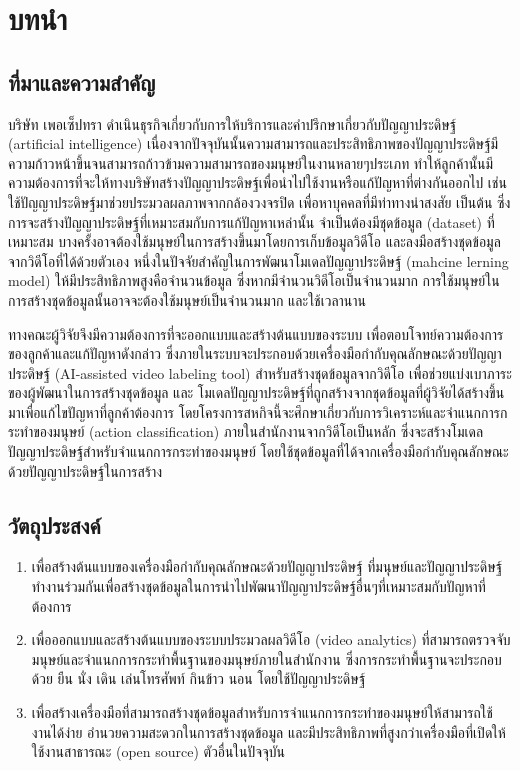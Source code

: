 \chapter{บทนำ}
\section{ที่มาและความสำคัญ}
บริษัท เพอเซ็ปทรา ดำเนินธุรกิจเกี่ยวกับการให้บริการและคำปรึกษาเกี่ยวกับปัญญาประดิษฐ์ (artificial intelligence)
เนื่องจากปัจจุบันนั้นความสามารถและประสิทธิภาพของปัญญาประดิษฐ์มีความก้าวหน้าขึ้นจนสามารถก้าวข้ามความสามารถของมนุษย์ในงานหลายๆประเภท
ทำให้ลูกค้านั้นมีความต้องการที่จะให้ทางบริษัทสร้างปัญญาประดิษฐ์เพื่อนำไปใช้งานหรือแก้ปัญหาที่ต่างกันออกไป เช่น ใช้ปัญญาประดิษฐ์มาช่วยประมวลผลภาพจากกล้องวงจรปิด เพื่อหาบุคคลที่มีท่าทางน่าสงสัย เป็นต้น
ซึ่งการจะสร้างปัญญาประดิษฐ์ที่เหมาะสมกับการแก้ปัญหาเหล่านั้น จำเป็นต้องมีชุดข้อมูล (dataset) ที่เหมาะสม บางครั้งอาจต้องใช้มนุษย์ในการสร้างขึ้นมาโดยการเก็บข้อมูลวิดีโอ 
และลงมือสร้างชุดข้อมูลจากวิดีโอที่ได้ด้วยตัวเอง หนึ่งในปัจจัยสำคัญในการพัฒนาโมเดลปัญญาประดิษฐ์ (mahcine lerning model) ให้มีประสิทธิภาพสูงคือจำนวนข้อมูล
ซึ่งหากมีจำนวนวิดีโอเป็นจำนวนมาก การใช้มนุษย์ในการสร้างชุดข้อมูลนั้นอาจจะต้องใช้มนุษย์เป็นจำนวนมาก และใช้เวลานาน 

ทางคณะผู้วิจัยจึงมีความต้องการที่จะออกแบบและสร้างต้นแบบของระบบ เพื่อตอบโจทย์ความต้องการของลูกค้าและแก้ปัญหาดังกล่าว ซึ่งภายในระบบจะประกอบด้วยเครื่องมือกำกับคุณลักษณะด้วยปัญญาประดิษฐ์ (AI-assisted video labeling tool) สำหรับสร้างชุดข้อมูลจากวิดีโอ เพื่อช่วยแบ่งเบาภาระของผู้พัฒนาในการสร้างชุดข้อมูล และ โมเดลปัญญาประดิษฐ์ที่ถูกสร้างจากชุดข้อมูลที่ผู้วิจัยได้สร้างขึ้นมาเพื่อแก้ไขปัญหาที่ลูกค้าต้องการ 
โดยโครงการสหกิจนี้จะศึกษาเกี่ยวกับการวิเคราะห์และจำแนกการกระทำของมนุษย์ (action classification) ภายในสำนักงานจากวิดีโอเป็นหลัก 
ซึ่งจะสร้างโมเดลปัญญาประดิษฐ์สำหรับจำแนกการกระทำของมนุษย์ โดยใช้ชุดข้อมูลที่ได้จากเครื่องมือกำกับคุณลักษณะด้วยปัญญาประดิษฐ์ในการสร้าง

\section{วัตถุประสงค์}
\begin{enumerate}
	\setlength\itemsep{-0.25em}
	\item เพื่อสร้างต้นแบบของเครื่องมือกำกับคุณลักษณะด้วยปัญญาประดิษฐ์ ที่มนุษย์และปัญญาประดิษฐ์ทำงานร่วมกันเพื่อสร้างชุดข้อมูลในการนำไปพัฒนาปัญญาประดิษฐ์อื่นๆที่เหมาะสมกับปัญหาที่ต้องการ
	\item เพื่อออกแบบและสร้างต้นแบบของระบบประมวลผลวิดีโอ (video analytics) ที่สามารถตรวจจับมนุษย์และจำแนกการกระทำพื้นฐานของมนุษย์ภายในสำนักงาน ซึ่งการกระทำพื้นฐานจะประกอบด้วย ยืน นั่ง เดิน เล่นโทรศัพท์ กินข้าว นอน โดยใช้ปัญญาประดิษฐ์
	\item เพื่อสร้างเครื่องมือที่สามารถสร้างชุดข้อมูลสำหรับการจำแนกการกระทำของมนุษย์ให้สามารถใช้งานได้ง่าย อำนวยความสะดวกในการสร้างชุดข้อมูล และมีประสิทธิภาพที่สูงกว่าเครื่องมือที่เปิดให้ใช้งานสาธารณะ (open source) ตัวอื่นในปัจจุบัน
\end{enumerate}

